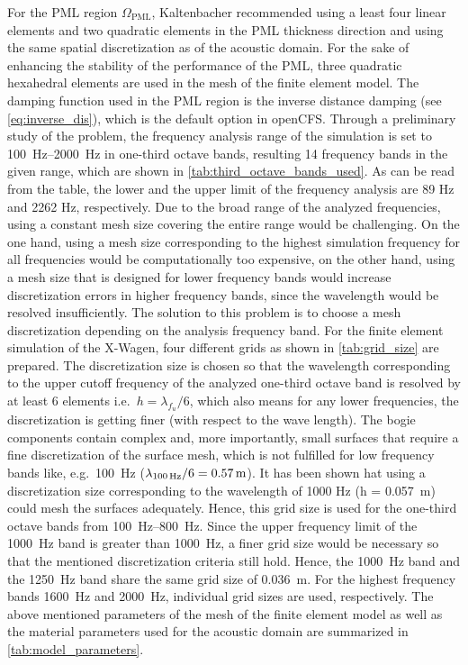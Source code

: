 For the PML region $\Omega_{\text{PML}}$, Kaltenbacher \cite{KALTENBACHER_PML_2013} recommended using a least four linear elements and two quadratic elements in the PML thickness direction and using the same spatial discretization as of the acoustic domain. For the sake of enhancing the stability of the performance of the PML, three quadratic hexahedral elements are used in the mesh of the finite element model. The damping function used in the PML region is the inverse distance damping (see \cref{eq:inverse_dis}), which is the default option in openCFS.
Through a preliminary study of the problem, the frequency analysis range of the simulation is set to \SIrange{100}{2000}{\hertz} in one-third octave bands, resulting 14 frequency bands in the given range, which are shown in \cref{tab:third_octave_bands_used}. As can be read from the table, the lower and the upper limit of the frequency analysis are 89 Hz and 2262 Hz, respectively. Due to the broad range of the analyzed frequencies, using a constant mesh size covering the entire range would be challenging. On the one hand, using a mesh size corresponding to the highest simulation frequency for all frequencies would be computationally too expensive, on the other hand, using a mesh size that is designed for lower frequency bands would increase discretization errors in higher frequency bands, since the wavelength would be resolved insufficiently. The solution to this problem is to choose a mesh discretization depending on the analysis frequency band. For the finite element simulation of the X-Wagen, four different grids as shown in \cref{tab:grid_size} are prepared. The discretization size is chosen so that the wavelength corresponding to the upper cutoff frequency of the analyzed one-third octave band is resolved by at least 6 elements i.e.\ $h = \lambda_{f_u} / 6$, which also means for any lower frequencies, the discretization is getting finer (with respect to the wave length). The bogie components contain complex and, more importantly, small surfaces that require a fine discretization of the surface mesh, which is not fulfilled for low frequency bands like, e.g.\ \SI{100}{\hertz} ($\lambda_{\text{\SI{100}{\hertz}}} / 6 = 0.57\,\text{m}$). It has been shown hat using a discretization size corresponding to the wavelength of 1000 Hz (h = \SI{0.057}{\meter}) could mesh the surfaces adequately. Hence, this grid size is used for the one-third octave bands from \SIrange{100}{800}{\hertz}. Since the upper frequency limit of the \SI{1000}{\hertz} band is greater than \SI{1000}{\hertz}, a finer grid size would be necessary so that the mentioned discretization criteria still hold. Hence, the \SI{1000}{\hertz} band and the \SI{1250}{\hertz} band share the same grid size of \SI{0.036}{\meter}. For the highest frequency bands \SI{1600}{\hertz} and \SI{2000}{\hertz}, individual grid sizes are used, respectively.
The above mentioned parameters of the mesh of the finite element model as well as the material parameters used for the acoustic domain are summarized in \cref{tab:model_parameters}.

